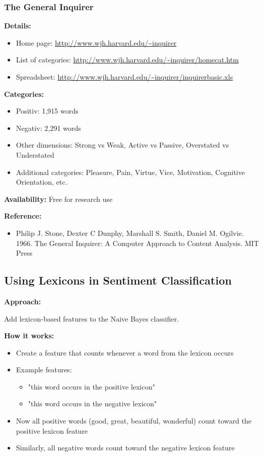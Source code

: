 \documentclass[11pt,a4paper]{article}
\theoremstyle{definition}
\theoremstyle{plain}
\theoremstyle{remark}
\begin{document}
\subsubsection{The General Inquirer}

\textbf{Details:}
\begin{itemize}
    \item Home page: \url{http://www.wjh.harvard.edu/~inquirer}
    \item List of categories: \url{http://www.wjh.harvard.edu/~inquirer/homecat.htm}
    \item Spreadsheet: \url{http://www.wjh.harvard.edu/~inquirer/inquirerbasic.xls}
\end{itemize}

\textbf{Categories:}
\begin{itemize}
    \item Positiv: 1,915 words
    \item Negativ: 2,291 words
    \item Other dimensions: Strong vs Weak, Active vs Passive, Overstated vs Understated
    \item Additional categories: Pleasure, Pain, Virtue, Vice, Motivation, Cognitive Orientation, etc.
\end{itemize}

\textbf{Availability:} Free for research use

\textbf{Reference:}
\begin{itemize}
    \item Philip J. Stone, Dexter C Dunphy, Marshall S. Smith, Daniel M. Ogilvie. 1966. The General Inquirer: A Computer Approach to Content Analysis. MIT Press
\end{itemize}

\subsection{Using Lexicons in Sentiment Classification}

\textbf{Approach:}

Add lexicon-based features to the Naive Bayes classifier.

\textbf{How it works:}
\begin{itemize}
    \item Create a feature that counts whenever a word from the lexicon occurs
    \item Example features:
    \begin{itemize}
        \item "this word occurs in the positive lexicon"
        \item "this word occurs in the negative lexicon"
    \end{itemize}
    \item Now all positive words (good, great, beautiful, wonderful) count toward the positive lexicon feature
    \item Similarly, all negative words count toward the negative lexicon feature
\end{itemize}
\end{document}
